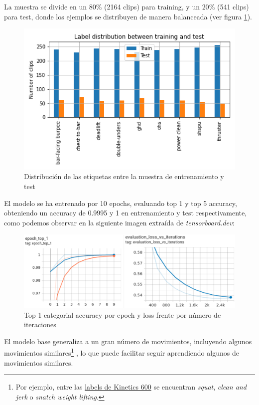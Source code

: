 La muestra se divide en un $80\%$ (2164 clips) para training, y un $20\%$ (541 clips) para test, donde los ejemplos se distribuyen de manera balanceada (ver figura \ref{sample_sizes}).

\begin{figure}[H]
    \centering
		\includegraphics[width=\textwidth]{figs/sample_sizes.png}
\caption{Distribución de las etiquetas entre la muestra de entrenamiento y test}\label{sample_sizes}
\end{figure}

El modelo se ha entrenado por 10 epochs, evaluando top 1 y top 5 accuracy, obteniendo un accuracy de 0.9995 y 1 en entrenamiento y test respectivamente, como podemos observar en la siguiente imagen extraída de \textit{tensorboard.dev}:

\begin{figure}[H]
    \centering
		\includegraphics[width=\textwidth]{figs/tensorboard_training.png}
\caption{Top 1 categorial accuracy por epoch y loss frente por número de iteraciones}\label{training}
\end{figure}

El modelo base generaliza a un gran número de movimientos, incluyendo algunos movimientos similares\footnote{Por ejemplo, entre las  \href{https://raw.githubusercontent.com/tensorflow/models/f8af2291cced43fc9f1d9b41ddbf772ae7b0d7d2/official/projects/movinet/files/kinetics_600_labels.txt}{labels de Kinetics 600} se encuentran \textit{squat}, \textit{clean and jerk} o \textit{snatch weight lifting}.} , lo que puede facilitar seguir aprendiendo algunos de movimientos similares.

